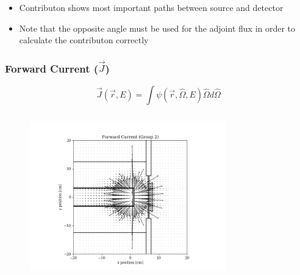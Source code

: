 \documentclass[t]{beamer}
\begin{document}
\begin{frame}
\begin{columns}
\begin{figure}
    \end{figure}
  \end{columns}
  \begin{itemize}
    \item Contributon shows most important paths between source and detector
    \item Note that the opposite angle must be used for the adjoint flux in
          order to calculate the contributon correctly
  \end{itemize}
\end{frame}

\begin{frame}
  \frametitle{Forward Current ($\vec{J}$)}
  \vskip-0.25in
  \begin{equation}
    \vec{J}\left(\vec{r},E\right) = \int\psi\left(\vec{r},\hat{\Omega},E\right)\hat{\Omega}d\hat{\Omega}
  \end{equation}
  \vskip-0.25in
  \begin{columns}
    \begin{figure}
      \includegraphics[trim={0.7in 0.15in 1.05in 0.4in},clip,scale=0.36]{images/current_fwd_g02.png}
    \end{figure}
    \begin{figure}

\end{figure}
\end{columns}
\end{frame}
\end{document}
